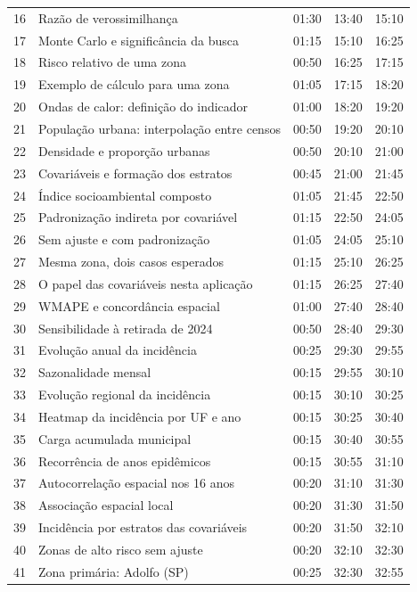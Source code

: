 \documentclass[11pt,a4paper]{article}
\begin{document}
{\begin{longtable}{@{}r p{8.1cm} r r r@{}}
16 & Razão de verossimilhança & 01:30 & 13:40 & 15:10\\
17 & Monte Carlo e significância da busca & 01:15 & 15:10 & 16:25\\
18 & Risco relativo de uma zona & 00:50 & 16:25 & 17:15\\
19 & Exemplo de cálculo para uma zona & 01:05 & 17:15 & 18:20\\
20 & Ondas de calor: definição do indicador & 01:00 & 18:20 & 19:20\\
21 & População urbana: interpolação entre censos & 00:50 & 19:20 & 20:10\\
22 & Densidade e proporção urbanas & 00:50 & 20:10 & 21:00\\
23 & Covariáveis e formação dos estratos & 00:45 & 21:00 & 21:45\\
24 & Índice socioambiental composto & 01:05 & 21:45 & 22:50\\
25 & Padronização indireta por covariável & 01:15 & 22:50 & 24:05\\
26 & Sem ajuste e com padronização & 01:05 & 24:05 & 25:10\\
27 & Mesma zona, dois casos esperados & 01:15 & 25:10 & 26:25\\
28 & O papel das covariáveis nesta aplicação & 01:15 & 26:25 & 27:40\\
29 & WMAPE e concordância espacial & 01:00 & 27:40 & 28:40\\
30 & Sensibilidade à retirada de 2024 & 00:50 & 28:40 & 29:30\\
31 & Evolução anual da incidência & 00:25 & 29:30 & 29:55\\
32 & Sazonalidade mensal & 00:15 & 29:55 & 30:10\\
33 & Evolução regional da incidência & 00:15 & 30:10 & 30:25\\
34 & Heatmap da incidência por UF e ano & 00:15 & 30:25 & 30:40\\
35 & Carga acumulada municipal & 00:15 & 30:40 & 30:55\\
36 & Recorrência de anos epidêmicos & 00:15 & 30:55 & 31:10\\
37 & Autocorrelação espacial nos 16 anos & 00:20 & 31:10 & 31:30\\
38 & Associação espacial local & 00:20 & 31:30 & 31:50\\
39 & Incidência por estratos das covariáveis & 00:20 & 31:50 & 32:10\\
40 & Zonas de alto risco sem ajuste & 00:20 & 32:10 & 32:30\\
41 & Zona primária: Adolfo (SP) & 00:25 & 32:30 & 32:55\\

\end{longtable}}
\end{document}
